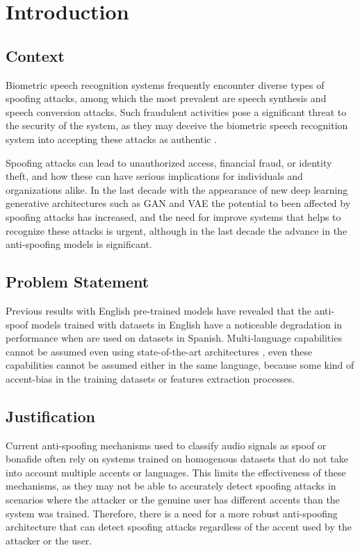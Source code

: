 \chapter{Introduction}

\section{Context}
Biometric speech recognition systems frequently encounter diverse types of spoofing attacks, among which the most prevalent are speech synthesis and speech conversion attacks. Such fraudulent activities pose a significant threat to the security of the system, as they may deceive the biometric speech recognition system into accepting these attacks as authentic \cite{xue2023physiological}.

Spoofing attacks can lead to unauthorized access, financial fraud, or identity theft, and how these can have serious implications for individuals and organizations alike. In the last decade with the appearance of new deep learning generative architectures such as \ac{GAN} \cite{goodfellow2020generative} and \ac{VAE} \cite{kingma2013auto} the potential to been affected by spoofing attacks has increased, and the need for improve systems that helps to recognize these attacks is urgent, although in the last decade the advance in the anti-spoofing models is significant.

\section{Problem Statement}
Previous results with English pre-trained models have revealed that the anti-spoof models trained with datasets in English have a noticeable degradation in performance when are used on datasets in Spanish. Multi-language capabilities cannot be assumed even using state-of-the-art architectures \cite{tamayo2022voice}, even these capabilities cannot be assumed either in the same language, because some kind of accent-bias in the training datasets or features extraction processes.

\section{Justification}
Current anti-spoofing mechanisms used to classify audio signals as spoof or bonafide often rely on systems trained on homogenous datasets that do not take into account multiple accents or languages. This limits the effectiveness of these mechanisms, as they may not be able to accurately detect spoofing attacks in scenarios where the attacker or the genuine user has different accents than the system was trained. Therefore, there is a need for a more robust anti-spoofing architecture that can detect spoofing attacks regardless of the accent used by the attacker or the user.


